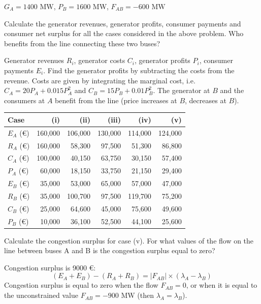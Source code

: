 \documentclass[11pt,a4paper,fleqn]{scrartcl}
\def\l{\lambda}
\def\mw{\text{ MW}}
\begin{document}
\begin{enumerate}[(a)]
\begin{enumerate}[(i)]
  $G_{A}=1400\mw$, $P_B=1600$ MW, $F_{AB}=-600\mw$
 \end{enumerate}
 \begin{shaded}\item Calculate the generator revenues, generator profits, consumer payments and consumer net surplus for all the cases considered in the above problem. Who benefits from the line connecting these two buses?\end{shaded}
 Generator revenues $R_{i}$, generator costs $C_{i}$, generator profits $P_{i}$, consumer payments $E_{i}$. Find the generator profits by subtracting the costs from the revenue. Costs are given by integrating the marginal cost, i.e. $C_A = 20P_A + 0.015P_A^2$ and $C_B = 15P_B + 0.01P_B^2$. The generator at $B$ and the consumers at $A$ benefit from the line (price increases at $B$, decreases at $B$).
 \begin{table}[!h]
  \centering
  \begin{tabular}{lrrrrr}
   \toprule
   Case          & (i)      & (ii)     & (iii)    & (iv)     & (v)      \\
   \midrule
   $E_A$ (\euro) & 160,000 & 106,000 & 130,000 & 114,000 & 124,000 \\
   $R_A$ (\euro) & 160,000 & 58,300  & 97,500  & 51,300  & 86,800  \\
   $C_A$ (\euro) & 100,000 & 40,150  & 63,750  & 30,150  & 57,400  \\
   $P_A$ (\euro) & 60,000  & 18,150  & 33,750  & 21,150  & 29,400  \\
   \midrule
   $E_B$ (\euro) & 35,000  & 53,000  & 65,000  & 57,000  & 47,000  \\
   $R_B$ (\euro) & 35,000  & 100,700 & 97,500  & 119,700 & 75,200  \\
   $C_B$ (\euro) & 25,000  & 64,600  & 45,000  & 75,600  & 49,600  \\
   $P_B$ (\euro) & 10,000  & 36,100  & 52,500  & 44,100  & 25,600  \\
   \bottomrule
  \end{tabular}
 \end{table}

 \begin{shaded}\item Calculate the congestion surplus for case (v). For what values of the flow on the line between buses A and B is the congestion surplus equal to zero?\end{shaded}
 Congestion surplus is 9000 \euro:
 \begin{equation*}
  \left(E_A + E_B\right) - (R_A + R_B) = |F_{AB}|\times (\l_A - \l_B)
 \end{equation*}
 Congestion surplus is equal to zero when the flow $F_{AB}=0$, or when it is equal to the unconstrained value $F_{AB}=-900\mw$ (then $\l_A = \l_B$).
\end{enumerate}
\end{document}
